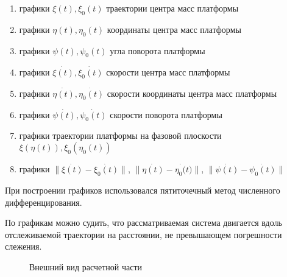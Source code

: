 \begin{enumerate}
\item{ графики  $\xi(t), \xi_0(t)$ траектории центра масс платформы }
\item{ графики  $\eta(t), \eta_0(t)$ координаты  центра масс платформы }
\item{ графики  $\psi(t), \psi_0(t)$ угла поворота платформы  }
\item{ графики  $\dot{\xi(t)}, \dot{\xi_0(t)}$ скорости центра масс платформы }
\item{ графики  $\dot{\eta(t)}, \dot{\eta_0(t)}$ скорости координаты  центра масс платформы }
\item{ графики  $\dot{\psi(t)}, \dot{\psi_0(t)}$ скорости поворота платформы  }
\item{ графики траектории платформы  на фазовой плоскости $\xi(\eta(t)), \xi_0(\eta_0(t))$}
\item{ графики  $\|\dot{\xi(t)} - \dot{\xi_0(t)}\|$, $\|\dot{\eta(t)} - \dot{\eta_0(t})\|$, 
$\|\dot{\psi(t)} - \dot{\psi_0(t)}\|$  }
\end{enumerate}
При построении графиков  использовался пятиточечный метод численного дифференцирования.

По графикам можно судить, что рассматриваемая система двигается вдоль отслеживаемой траектории на расстоянии, не превышающем погрешности слежения.

\begin{figure}[h]
\caption{Внешний вид расчетной части}
\label{ris:graph}
\end{figure}


